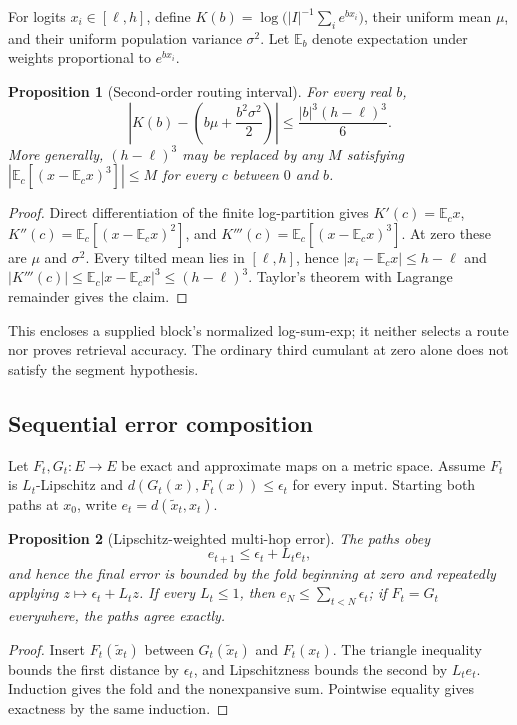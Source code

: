 \documentclass[11pt]{article}
\numberwithin{equation}{section}
\newtheorem{proposition}{Proposition}
\begin{document}
For logits $x_i\in[\ell,h]$, define
$K(b)=\log\bigl(|I|^{-1}\sum_i e^{b x_i}\bigr)$, their uniform mean $\mu$, and their uniform population
variance $\sigma^2$. Let $\mathbb E_b$ denote expectation under weights proportional to $e^{b x_i}$.

\begin{proposition}[Second-order routing interval]\label{prop:app-cumulant-interval}
For every real $b$,
\[
\left|K(b)-\left(b\mu+\frac{b^2\sigma^2}{2}\right)\right|
\le \frac{|b|^3(h-\ell)^3}{6}.
\]
More generally, $(h-\ell)^3$ may be replaced by any $M$ satisfying
$|\mathbb E_c[(x-\mathbb E_c x)^3]|\le M$ for every $c$ between $0$ and $b$.
\end{proposition}
\begin{proof}
Direct differentiation of the finite log-partition gives
$K'(c)=\mathbb E_c x$, $K''(c)=\mathbb E_c[(x-\mathbb E_c x)^2]$, and
$K'''(c)=\mathbb E_c[(x-\mathbb E_c x)^3]$. At zero these are $\mu$ and $\sigma^2$. Every tilted mean
lies in $[\ell,h]$, hence $|x_i-\mathbb E_c x|\le h-\ell$ and
$|K'''(c)|\le\mathbb E_c|x-\mathbb E_c x|^3\le(h-\ell)^3$. Taylor's theorem with Lagrange remainder gives
the claim.
\end{proof}

This encloses a supplied block's normalized log-sum-exp; it neither selects a route nor proves retrieval
accuracy. The ordinary third cumulant at zero alone does not satisfy the segment hypothesis.

\subsection{Sequential error composition}

Let $F_t,G_t:E\to E$ be exact and approximate maps on a metric space. Assume $F_t$ is
$L_t$-Lipschitz and $d(G_t(x),F_t(x))\le\epsilon_t$ for every input. Starting both paths at $x_0$, write
$e_t=d(\widetilde x_t,x_t)$.

\begin{proposition}[Lipschitz-weighted multi-hop error]\label{prop:app-sequential-error}
The paths obey
\[
e_{t+1}\le\epsilon_t+L_t e_t,
\]
and hence the final error is bounded by the fold beginning at zero and repeatedly applying
$z\mapsto\epsilon_t+L_tz$. If every $L_t\le1$, then
$e_N\le\sum_{t<N}\epsilon_t$; if $F_t=G_t$ everywhere, the paths agree exactly.
\end{proposition}
\begin{proof}
Insert $F_t(\widetilde x_t)$ between $G_t(\widetilde x_t)$ and $F_t(x_t)$. The triangle inequality bounds
the first distance by $\epsilon_t$, and Lipschitzness bounds the second by $L_te_t$. Induction gives the fold
and the nonexpansive sum. Pointwise equality gives exactness by the same induction.
\end{proof}
\end{document}
